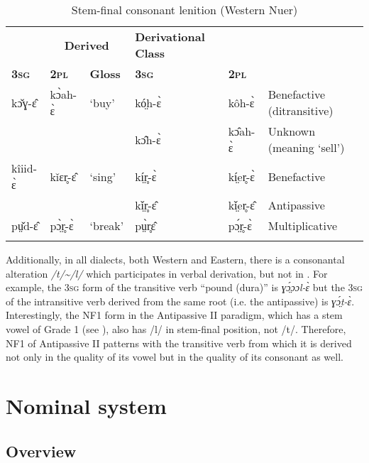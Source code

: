 \documentclass[output=paper,newtxmath,modfonts,nonflat,draftmode]{langsci/langscibook}
\begin{document}
\begin{table}
\begin{tabularx}{\textwidth}{lllllX}
\lsptoprule

\multicolumn{3}{c}{\bfseries Transitive} & \multicolumn{2}{c}{\bfseries Derived} & \bfseries Derivational Class\\
\bfseries\scshape 3sg & \bfseries\scshape 2pl & \bfseries Gloss & \bfseries\scshape 3sg & \multicolumn{1}{l}{\bfseries\scshape 2pl} & \\
\midrule
kɔ̌ɣ-ɛ̂ & kɔ̀ah-ɛ̀ & ‘buy’ & kó̤h-ɛ̀ & kôh-ɛ̀ & Benefactive (ditransitive)\\
&  &  & kɔ̂h-ɛ̀ & kɔ̂ah-ɛ̀ & Unknown (meaning ‘sell’)\\

\tablevspace
kîiid-ɛ̀ & kǐɛr̥-ɛ̂ & ‘sing’ & kí̤r̥-ɛ̀ & kí̤er̥-ɛ̀ & Benefactive\\
&  &  & kǐ̤r̥-ɛ̂ & kǐ̤er̥-ɛ̂ & Antipassive\\

\tablevspace
pṳ̌d-ɛ̂ & pɔ̤̀r̥-ɛ̀ & ‘break’ & pṳ̀r̥ɛ̂ & pɔ̤́r̥-ɛ̀ & Multiplicative\\
\lspbottomrule
\end{tabularx}
\caption{Stem-final consonant lenition (Western Nuer)}
\label{tab:monich:16}
\end{table}

Additionally, in all  dialects, both Western and Eastern, there is a consonantal alteration \textit{/t/{\textasciitilde}/l/} which participates in verbal derivation, but not in . For example, the 3\textsc{sg} form of the transitive verb “pound (dura)” is \textit{ɣɔ̤́ɔɔl-ɛ̀} but the 3\textsc{sg} of the intransitive verb derived from the same root (i.e. the antipassive) is \textit{ɣɔ̤́t-ɛ̀}. Interestingly, the NF1 form in the Antipassive II paradigm, which has a stem vowel of Grade 1 (see ), also has /l/ in stem-final position, not /t/. Therefore, NF1 of Antipassive II patterns with the transitive verb from which it is derived not only in the quality of its vowel but in the quality of its consonant as well.

\section{Nominal system}
\subsection{Overview}
\end{document}

